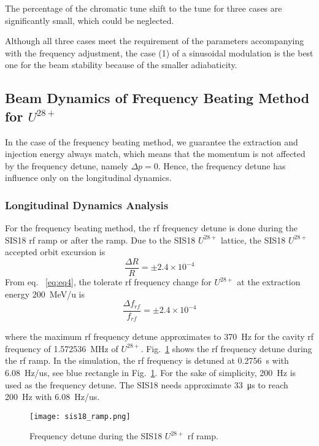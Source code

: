 The percentage of the chromatic tune shift to the tune for three cases are significantly small, which could be neglected.

Although all three cases meet the requirement of the parameters accompanying with the frequency adjustment, the case (1) of a sinusoidal modulation is the best one for the beam stability because of the smaller adiabaticity.  
\subsection{Beam Dynamics of Frequency Beating Method for $U^\mathit{28+}$} 
In the case of the frequency beating method, we guarantee the extraction and injection energy always match, which means that the momentum is not affected by the frequency detune, namely $\Delta p = 0$. Hence, the frequency detune has influence only on the longitudinal dynamics.

\subsubsection{Longitudinal Dynamics Analysis}
For the frequency beating method, the rf frequency detune is done during the SIS18 rf ramp or after the ramp. Due to the SIS18 $U^\mathit{28+}$ lattice, the SIS18 $U^\mathit{28+}$ accepted orbit excursion is~\cite{liebermann_fair_2013}
\begin{equation}
\frac{\Delta{R}}{R} = \pm 2.4 \times 10^{-4}
\end{equation}
From eq. ~\ref{eq:eq4}, the tolerate rf frequency change for $U^{28+}$ at the extraction energy \SI{200}{MeV/u} is
\begin{equation}
\frac{\Delta{f}_\mathit{rf}}{f_\mathit{rf}} = \pm 2.4 \times 10^{-4}
\end{equation}


where the maximum rf frequency detune approximates to \SI{370}{Hz} for the cavity rf frequency of \SI{1.572536}{MHz} of $U^{ 28+}$. Fig.~\ref{sis18_ramp} shows the rf frequency detune during the rf ramp. In the simulation, the rf frequency is detuned at \SI{0.2756}{s} with \SI{6.08}{Hz/us}, see blue rectangle in Fig.~\ref{sis18_ramp}. For the sake of simplicity, \SI{200}{Hz} is used as the frequency detune. The SIS18 needs approximate \SI{33}{\micro\second} to reach \SI{200}{Hz} with \SI{6.08}{Hz/us}.
\begin{figure}[!htb]
   \centering   
   \texttt{[image: sis18\_ramp.png]}
   \caption{Frequency detune during the SIS18 $U^{28+}$ rf ramp.}
   \label{sis18_ramp}
\end{figure}

